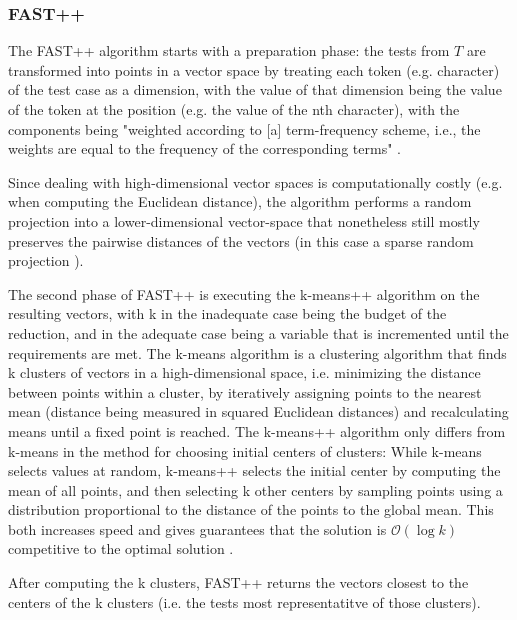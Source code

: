 \subsubsection{FAST++}


The FAST++ algorithm starts with a preparation phase: the tests from $T$
are transformed into points in a vector space by treating each token
(e.g. character) of the test case as a dimension, with the value of that
dimension being the value of the token at the position (e.g. the value
of the nth character), with the components being "weighted according to
[a] term-frequency scheme, i.e., the weights are equal to the frequency
of the corresponding terms" \cite{cruciani2019scalable}.

Since dealing with high-dimensional vector spaces is computationally
costly (e.g. when computing the Euclidean distance), the algorithm
performs a random projection into a lower-dimensional vector-space that
nonetheless still mostly preserves the pairwise distances of the vectors
(in this case a sparse random projection \cite{achlioptas2003database}).

The second phase of FAST++ is executing the k-means++ algorithm
\cite{arthur2006k} on the resulting vectors, with k in the inadequate
case being the budget of the reduction, and in the adequate case being a
variable that is incremented until the requirements are met. The k-means
algorithm is a clustering algorithm that finds k clusters of vectors in a
high-dimensional space, i.e. minimizing the distance between points within
a cluster, by iteratively assigning points to the nearest mean (distance
being measured in squared Euclidean distances) and recalculating means
until a fixed point is reached. The k-means++ algorithm only differs
from k-means in the method for choosing initial centers of clusters:
While k-means selects values at random, k-means++ selects the initial
center by computing the mean of all points, and then selecting k other
centers by sampling points using a distribution proportional to the
distance of the points to the global mean. This both increases speed and
gives guarantees that the solution is $\mathcal{O}(\log k)$ competitive
to the optimal solution \cite{arthur2006k}.

After computing the k clusters, FAST++ returns the vectors closest to
the centers of the k clusters (i.e. the tests most representatitve of
those clusters).

